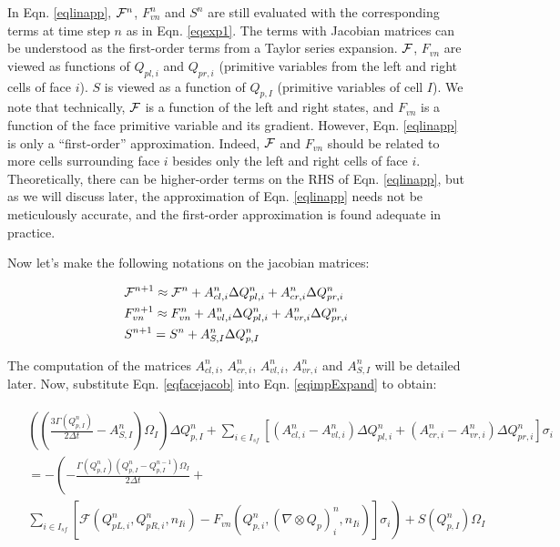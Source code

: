 \documentclass[12pt, letterpaper]{report}
\begin{document}
In Eqn. \ref{eqlinapp}, $\mathcal{F}^n$, $F_{vn}^n$ and $S^n$ are still evaluated with the corresponding
terms at time step $n$ as in Eqn. \ref{eqexp1}. The terms with Jacobian matrices can be understood
as the first-order terms from a Taylor series expansion. $\mathcal{F}$, $F_{vn}$ are viewed as functions of
$Q_{pl,i}$ and $Q_{pr,i}$ (primitive variables from the left and right cells of face $i$). $S$ is
viewed as a function of $Q_{p,I}$ (primitive variables of cell $I$). We note that technically, $\mathcal{F}$
is a function of the left and right states, and $F_{vn}$ is a function of the face primitive
variable and its gradient. However, Eqn. \ref{eqlinapp} is only a ``first-order'' approximation.
Indeed, $\mathcal{F}$ and $F_{vn}$ should be related to more cells surrounding face $i$ besides only the left
and right cells of face $i$. Theoretically, there can be higher-order terms on the RHS of Eqn.
\ref{eqlinapp}, but as we will discuss later, the approximation of Eqn. \ref{eqlinapp} needs not be
meticulously accurate, and the first-order approximation is found adequate in practice.
\paraspace

Now let's make the following notations on the jacobian matrices:

\begin{align}\label{eqfacejacob}
   \begin{split}
      &\mathcal{F}^{n+1} \approx \mathcal{F}^n + A_{cl,i}^n \Delta Q_{pl,i}^n + A_{cr,i}^n \Delta Q_{pr,i}^n \\
      &F_{vn}^{n+1} \approx F_{vn}^n + A_{vl,i}^n \Delta Q_{pl,i}^n + A_{vr,i}^n \Delta Q_{pr,i}^n \\
      &S^{n+1} = S^n + A_{S,I}^n \Delta Q_{p,I}^n
   \end{split}
\end{align}

The computation of the matrices $A_{cl,i}^n$, $A_{cr,i}^n$, $A_{vl,i}^n$, $A_{vr,i}^n$ and
$A_{S,I}^n$ will be detailed later. Now, substitute Eqn. \ref{eqfacejacob} into Eqn.
\ref{eqimpExpand} to obtain:

\begin{align}\label{eqimpExpand2}
   \begin{split}
   &\left(\left(\frac{3\Gamma (Q_{p,I}^n)}{2\Delta t} - A_{S,I}^n\right) \Omega_I\right) \Delta
   Q_{p,I}^n + \sum_{i \in I_{sf}} \left[ (A_{cl,i}^n - A_{vl,i}^n) \Delta Q_{pl,i}^n + ( A_{cr,i}^n
   - A_{vr,i}^n) \Delta Q_{pr,i}^n \right] \sigma_i \\
   &= -\left(-\frac{\Gamma(Q_{p,I}^n) (Q_{p,I}^n - Q_{p,I}^{n-1})\Omega_I}{2\Delta t} +
         \right.\\
      &\left.\sum_{i \in
            I_{sf}}\left[\mathcal{F}(Q_{pL,i}^n, Q_{pR,i}^n, n_{Ii}) - F_{vn}(Q_{p,i}^n, (\nabla
\mathop{\otimes} Q_p)_i^n, n_{Ii})\right]\sigma_i\right) + S(Q_{p,I}^n)\Omega_I
   \end{split}
\end{align}
\end{document}
